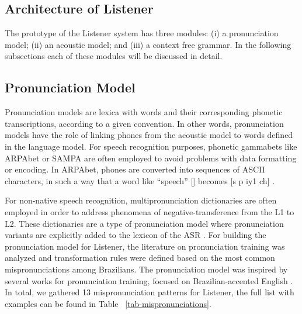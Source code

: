 \documentclass[twocolumn]{bmcart}%
\begin{document}
\subsection*{\textbf{Architecture of Listener}}
The prototype of the Listener system has three modules: (i) a pronunciation model; (ii) an acoustic model; and (iii) a context free grammar. In the following subsections each of these modules will be discussed in detail.

\subsection*{\textbf{Pronunciation Model}}

Pronunciation models are lexica with words and their corresponding phonetic transcriptions, according to a given convention. In other words, pronunciation models have the role of linking phones from the acoustic model to words defined in the language model. For speech recognition purposes, phonetic gammabets like ARPAbet or SAMPA are often employed to avoid problems with data formatting or encoding. In ARPAbet, phones are converted into sequences of ASCII characters, in such a way that a word like ``speech'' [] becomes [s p iy1 ch] \cite{CMUDict2008}.

For non-native speech recognition, multipronunciation dictionaries are often employed in order to address phenomena of negative-transference from the L1 to L2. These dictionaries are a type of pronunciation model where pronunciation variants are explicitly added to the lexicon of the ASR \cite{Strik2001}. For building the pronunciation model for Listener, the literature on pronunciation training was analyzed and transformation rules were defined based on the most common mispronunciations among Brazilians. The pronunciation model was inspired by several works for pronunciation training, focused on Brazilian-accented English \citep{Zimmer2004, Zimmer2009, Cristofaro2015}. In total, we gathered 13 mispronunciation patterns for Listener, the full list with examples can be found in Table ~\ref{tab-mispronunciations}.
\end{document}
